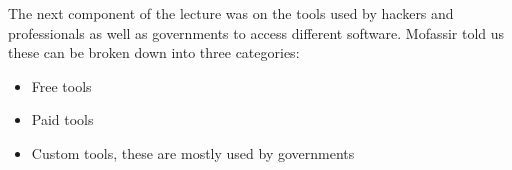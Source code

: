 \documentclass{article}
\begin{document}
The next component of the lecture was on the tools used by hackers and professionals as well as
governments to access different software. Mofassir told us these can be broken down into three
categories:

\begin{itemize}
    
    \item{Free tools}

    \item{Paid tools}

    \item{Custom tools, these are mostly used by governments}

\end{itemize}
\end{document}
